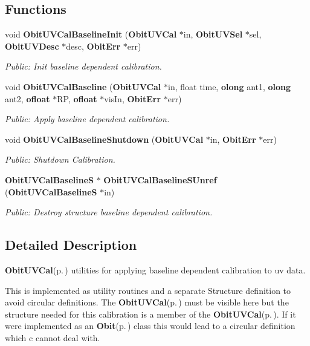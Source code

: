 \subsection*{Functions}
\begin{CompactItemize}
\item 
void {\bf Obit\-UVCal\-Baseline\-Init} ({\bf Obit\-UVCal} $\ast$in, {\bf Obit\-UVSel} $\ast$sel, {\bf Obit\-UVDesc} $\ast$desc, {\bf Obit\-Err} $\ast$err)
\begin{CompactList}\small\item\em Public: Init baseline dependent calibration. \item\end{CompactList}\item 
void {\bf Obit\-UVCal\-Baseline} ({\bf Obit\-UVCal} $\ast$in, float time, {\bf olong} ant1, {\bf olong} ant2, {\bf ofloat} $\ast$RP, {\bf ofloat} $\ast$vis\-In, {\bf Obit\-Err} $\ast$err)
\begin{CompactList}\small\item\em Public: Apply baseline dependent calibration. \item\end{CompactList}\item 
void {\bf Obit\-UVCal\-Baseline\-Shutdown} ({\bf Obit\-UVCal} $\ast$in, {\bf Obit\-Err} $\ast$err)
\begin{CompactList}\small\item\em Public: Shutdown Calibration. \item\end{CompactList}\item 
{\bf Obit\-UVCal\-Baseline\-S} $\ast$ {\bf Obit\-UVCal\-Baseline\-SUnref} ({\bf Obit\-UVCal\-Baseline\-S} $\ast$in)
\begin{CompactList}\small\item\em Public: Destroy structure baseline dependent calibration. \item\end{CompactList}\end{CompactItemize}


\subsection{Detailed Description}
{\bf Obit\-UVCal}{\rm (p.\,\pageref{structObitUVCal})} utilities for applying baseline dependent calibration to uv data. 

This is implemented as utility routines and a separate Structure definition to avoid circular definitions. The {\bf Obit\-UVCal}{\rm (p.\,\pageref{structObitUVCal})} must be visible here but the structure needed for this calibration is a member of the {\bf Obit\-UVCal}{\rm (p.\,\pageref{structObitUVCal})}. If it were implemented as an {\bf Obit}{\rm (p.\,\pageref{structObit})} class this would lead to a circular definition which c cannot deal with.

